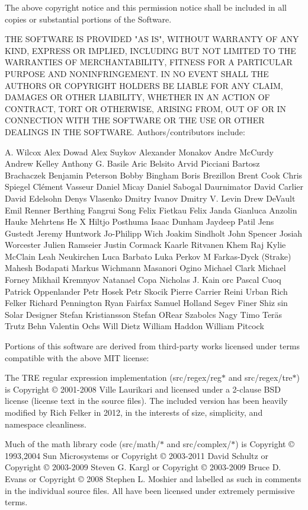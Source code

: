 The above copyright notice and this permission notice shall be included in all copies or substantial portions of the Software.

THE SOFTWARE IS PROVIDED "{}\+AS IS"{}, WITHOUT WARRANTY OF ANY KIND, EXPRESS OR IMPLIED, INCLUDING BUT NOT LIMITED TO THE WARRANTIES OF MERCHANTABILITY, FITNESS FOR A PARTICULAR PURPOSE AND NONINFRINGEMENT. IN NO EVENT SHALL THE AUTHORS OR COPYRIGHT HOLDERS BE LIABLE FOR ANY CLAIM, DAMAGES OR OTHER LIABILITY, WHETHER IN AN ACTION OF CONTRACT, TORT OR OTHERWISE, ARISING FROM, OUT OF OR IN CONNECTION WITH THE SOFTWARE OR THE USE OR OTHER DEALINGS IN THE SOFTWARE. Authors/contributors include\+:

A. Wilcox Alex Dowad Alex Suykov Alexander Monakov Andre Mc\+Curdy Andrew Kelley Anthony G. Basile Aric Belsito Arvid Picciani Bartosz Brachaczek Benjamin Peterson Bobby Bingham Boris Brezillon Brent Cook Chris Spiegel Clément Vasseur Daniel Micay Daniel Sabogal Daurnimator David Carlier David Edelsohn Denys Vlasenko Dmitry Ivanov Dmitry V. Levin Drew De\+Vault Emil Renner Berthing Fangrui Song Felix Fietkau Felix Janda Gianluca Anzolin Hauke Mehrtens He X Hiltjo Posthuma Isaac Dunham Jaydeep Patil Jens Gustedt Jeremy Huntwork Jo-\/\+Philipp Wich Joakim Sindholt John Spencer Josiah Worcester Julien Ramseier Justin Cormack Kaarle Ritvanen Khem Raj Kylie Mc\+Clain Leah Neukirchen Luca Barbato Luka Perkov M Farkas-\/\+Dyck (Strake) Mahesh Bodapati Markus Wichmann Masanori Ogino Michael Clark Michael Forney Mikhail Kremnyov Natanael Copa Nicholas J. Kain orc Pascal Cuoq Patrick Oppenlander Petr Hosek Petr Skocik Pierre Carrier Reini Urban Rich Felker Richard Pennington Ryan Fairfax Samuel Holland Segev Finer Shiz sin Solar Designer Stefan Kristiansson Stefan O\textquotesingle{}Rear Szabolcs Nagy Timo Teräs Trutz Behn Valentin Ochs Will Dietz William Haddon William Pitcock

Portions of this software are derived from third-\/party works licensed under terms compatible with the above MIT license\+:

The TRE regular expression implementation (src/regex/reg\texorpdfstring{$\ast$}{*} and src/regex/tre\texorpdfstring{$\ast$}{*}) is Copyright © 2001-\/2008 Ville Laurikari and licensed under a 2-\/clause BSD license (license text in the source files). The included version has been heavily modified by Rich Felker in 2012, in the interests of size, simplicity, and namespace cleanliness.

Much of the math library code (src/math/\texorpdfstring{$\ast$}{*} and src/complex/\texorpdfstring{$\ast$}{*}) is Copyright © 1993,2004 Sun Microsystems or Copyright © 2003-\/2011 David Schultz or Copyright © 2003-\/2009 Steven G. Kargl or Copyright © 2003-\/2009 Bruce D. Evans or Copyright © 2008 Stephen L. Moshier and labelled as such in comments in the individual source files. All have been licensed under extremely permissive terms.

